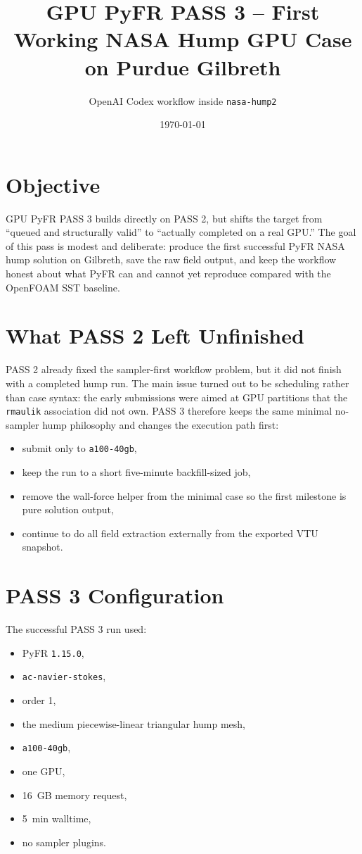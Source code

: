 \documentclass[11pt]{article}
\title{GPU PyFR PASS 3 -- First Working NASA Hump GPU Case on Purdue Gilbreth}
\author{OpenAI Codex workflow inside \texttt{nasa-hump2}}
\date{\today}
\begin{document}
\maketitle

\section{Objective}
GPU PyFR PASS 3 builds directly on PASS 2, but shifts the target from ``queued and structurally valid'' to ``actually completed on a real GPU.'' The goal of this pass is modest and deliberate: produce the first successful PyFR NASA hump solution on Gilbreth, save the raw field output, and keep the workflow honest about what PyFR can and cannot yet reproduce compared with the OpenFOAM SST baseline.

\section{What PASS 2 Left Unfinished}
PASS 2 already fixed the sampler-first workflow problem, but it did not finish with a completed hump run. The main issue turned out to be scheduling rather than case syntax: the early submissions were aimed at GPU partitions that the \texttt{rmaulik} association did not own. PASS 3 therefore keeps the same minimal no-sampler hump philosophy and changes the execution path first:
\begin{itemize}
  \item submit only to \texttt{a100-40gb},
  \item keep the run to a short five-minute backfill-sized job,
  \item remove the wall-force helper from the minimal case so the first milestone is pure solution output,
  \item continue to do all field extraction externally from the exported VTU snapshot.
\end{itemize}

\section{PASS 3 Configuration}
The successful PASS 3 run used:
\begin{itemize}
  \item PyFR \texttt{1.15.0},
  \item \texttt{ac-navier-stokes},
  \item order 1,
  \item the medium piecewise-linear triangular hump mesh,
  \item \texttt{a100-40gb},
  \item one GPU,
  \item \SI{16}{GB} memory request,
  \item \SI{5}{min} walltime,
  \item no sampler plugins.
\end{itemize}
\end{document}
